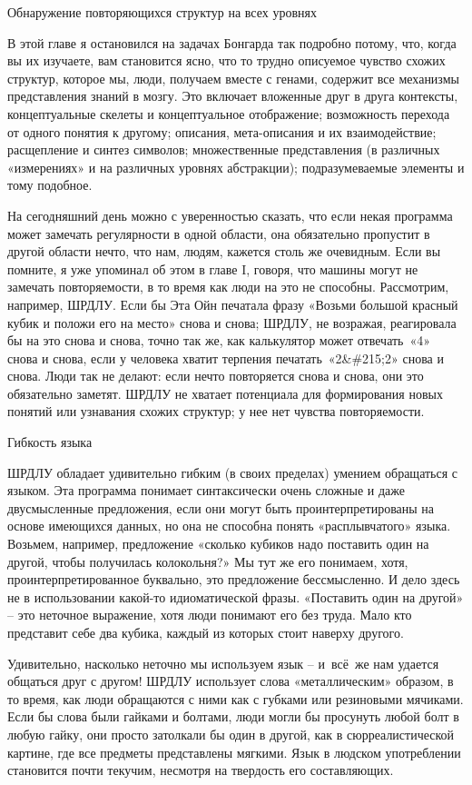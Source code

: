 \documentclass[../main.tex]{subfiles}
\begin{document}
Обнаружение повторяющихся структур на всех уровнях

В этой главе я остановился на задачах Бонгарда так подробно потому, что, когда вы их изучаете, вам становится ясно, что то трудно описуемое чувство схожих структур, которое мы, люди, получаем вместе с генами, содержит все механизмы представления знаний в мозгу. Это включает вложенные друг в друга контексты, концептуальные скелеты и концептуальное отображение; возможность перехода от одного понятия к другому; описания, мета-описания и их взаимодействие; расщепление и синтез символов; множественные представления (в различных «измерениях» и на различных уровнях абстракции); подразумеваемые элементы и тому подобное.

На сегодняшний день можно с уверенностью сказать, что если некая программа может замечать регулярности в одной области, она обязательно пропустит в другой области нечто, что нам, людям, кажется столь же очевидным. Если вы помните, я уже упоминал об этом в главе I, говоря, что машины могут не замечать повторяемости, в то время как люди на это не способны. Рассмотрим, например, ШРДЛУ. Если бы Эта Ойн печатала фразу «Возьми большой красный кубик и положи его на место» снова и снова; ШРДЛУ, не возражая, реагировала бы на это снова и снова, точно так же, как калькулятор может отвечать~«4» снова и снова, если у человека хватит терпения печатать~«2\&\#215;2» снова и снова. Люди так не делают: если нечто повторяется снова и снова, они это обязательно заметят. ШРДЛУ не хватает потенциала для формирования новых понятий или узнавания схожих структур; у нее нет чувства повторяемости.

Гибкость языка

ШРДЛУ обладает удивительно гибким (в своих пределах) умением обращаться с языком. Эта программа понимает синтаксически очень сложные и даже двусмысленные предложения, если они могут быть проинтерпретированы на основе имеющихся данных, но она не способна понять «расплывчатого» языка. Возьмем, например, предложение «сколько кубиков надо поставить один на другой, чтобы получилась колокольня?» Мы тут же его понимаем, хотя, проинтерпретированное буквально, это предложение бессмысленно. И дело здесь не в использовании какой-то идиоматической фразы. «Поставить один на другой» \--- это неточное выражение, хотя люди понимают его без труда. Мало кто представит себе два кубика, каждый из которых стоит наверху другого.

Удивительно, насколько неточно мы используем язык \--- и~всё~же нам удается общаться друг с другом! ШРДЛУ использует слова «металлическим» образом, в то время, как люди обращаются с ними как с губками или резиновыми мячиками. Если бы слова были гайками и болтами, люди могли бы просунуть любой болт в любую гайку, они просто затолкали бы один в другой, как в сюрреалистической картине, где все предметы представлены мягкими. Язык в людском употреблении становится почти текучим, несмотря на твердость его составляющих.
\end{document}
